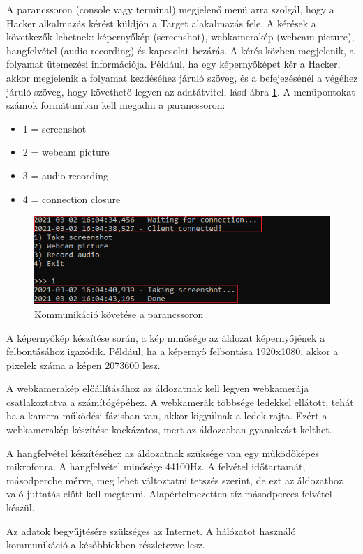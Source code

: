 \documentclass[12pt,a4paper,oneside]{report}
\begin{document}
A parancssoron (console vagy terminal) megjelenő menü arra szolgál, hogy a Hacker alkalmazás kérést küldjön a Target alakalmazás fele. A kérések a következők lehetnek: képernyőkép (screenshot), webkamerakép (webcam picture), hangfelvétel (audio recording) és kapcsolat bezárás. A kérés közben megjelenik, a folyamat ütemezési információja. Például, ha egy képernyőképet kér a Hacker, akkor megjelenik a folyamat kezdéséhez járuló szöveg, és a befejezésénél a végéhez járuló szöveg, hogy követhető legyen az adatátvitel, lásd ábra \ref{fig:logging}. A menüpontokat számok formátumban kell megadni a parancssoron:
\begin{itemize}
\item 1 = screenshot
\item 2 = webcam picture
\item 3 = audio recording
\item 4 = connection closure
\end{itemize}
\begin{figure}[H]
\centering
\includegraphics[width=400pt]{../images/tempsnip}
\caption{Kommunikáció követése a parancssoron}
\label{fig:logging}
\end{figure}

A képernyőkép készítése során, a kép minősége az áldozat képernyőjének a felbontásához igazódik. Például, ha a képernyő felbontása 1920x1080, akkor a pixelek száma a képen 2073600 lesz.

A webkamerakép előállításához az áldozatnak kell legyen webkamerája csatlakoztatva a számítógépéhez. A webkamerák többsége ledekkel ellátott, tehát ha a kamera működési fázisban van, akkor kigyúlnak a ledek rajta. Ezért a webkamerakép készítése kockázatos, mert az áldozatban gyanakvást kelthet.

A hangfelvétel készítéséhez az áldozatnak szüksége van egy működőképes mikrofonra. A hangfelvétel minősége 44100Hz. A felvétel időtartamát, másodpercbe mérve, meg lehet változtatni tetszés szerint, de ezt az áldozathoz való juttatás előtt kell megtenni. Alapértelmezetten tíz másodperces felvétel készül.

Az adatok begyűjtésére szükséges az Internet. A hálózatot használó kommunikáció a későbbiekben részletezve lesz.
\end{document}
